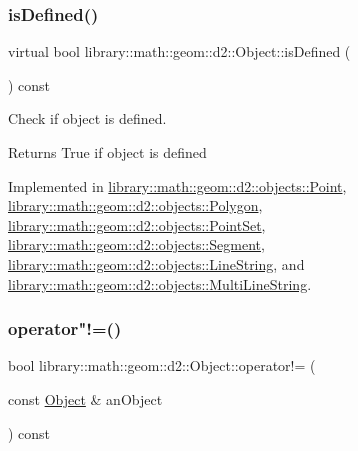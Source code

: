 \subsubsection{\texorpdfstring{is\+Defined()}{isDefined()}}
{\footnotesize\ttfamily virtual bool library\+::math\+::geom\+::d2\+::\+Object\+::is\+Defined (\begin{DoxyParamCaption}{ }\end{DoxyParamCaption}) const\hspace{0.3cm}{\ttfamily [pure virtual]}}



Check if object is defined. 

\begin{DoxyReturn}{Returns}
True if object is defined 
\end{DoxyReturn}


Implemented in \hyperlink{classlibrary_1_1math_1_1geom_1_1d2_1_1objects_1_1_point_ac90251968d8eb11df82e28f6cf095e5c}{library\+::math\+::geom\+::d2\+::objects\+::\+Point}, \hyperlink{classlibrary_1_1math_1_1geom_1_1d2_1_1objects_1_1_polygon_a83e0962f91f0732048e156ad634faaea}{library\+::math\+::geom\+::d2\+::objects\+::\+Polygon}, \hyperlink{classlibrary_1_1math_1_1geom_1_1d2_1_1objects_1_1_point_set_a031a6b5688c65bce8f37af452c0f0959}{library\+::math\+::geom\+::d2\+::objects\+::\+Point\+Set}, \hyperlink{classlibrary_1_1math_1_1geom_1_1d2_1_1objects_1_1_segment_a2c366d74328cdce4a7e83a761a84dbc7}{library\+::math\+::geom\+::d2\+::objects\+::\+Segment}, \hyperlink{classlibrary_1_1math_1_1geom_1_1d2_1_1objects_1_1_line_string_a2ef4a1e387ed463286fac7c93fd7b022}{library\+::math\+::geom\+::d2\+::objects\+::\+Line\+String}, and \hyperlink{classlibrary_1_1math_1_1geom_1_1d2_1_1objects_1_1_multi_line_string_a77de687b2c287226984e2614dafe744a}{library\+::math\+::geom\+::d2\+::objects\+::\+Multi\+Line\+String}.

\mbox{\label{classlibrary_1_1math_1_1geom_1_1d2_1_1_object_a538fa27124314cddf9705cf35a3efc08}} 
\subsubsection{\texorpdfstring{operator"!=()}{operator!=()}}
{\footnotesize\ttfamily bool library\+::math\+::geom\+::d2\+::\+Object\+::operator!= (\begin{DoxyParamCaption}\item[{const \hyperlink{classlibrary_1_1math_1_1geom_1_1d2_1_1_object}{Object} \&}]{an\+Object }\end{DoxyParamCaption}) const}

